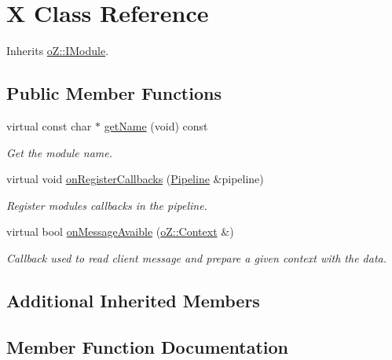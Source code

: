 \hypertarget{class_x}{}\section{X Class Reference}
\label{class_x}


Inherits \mbox{\hyperlink{classo_z_1_1_i_module}{o\+Z\+::\+I\+Module}}.

\subsection*{Public Member Functions}
\begin{DoxyCompactItemize}
\item 
virtual const char $\ast$ \mbox{\hyperlink{class_x_a07571cea65a55ff9820ad762eef52008}{get\+Name}} (void) const
\begin{DoxyCompactList}\small\item\em Get the module name. \end{DoxyCompactList}\item 
virtual void \mbox{\hyperlink{class_x_a15a956080c7158b8979f2a674ca28443}{on\+Register\+Callbacks}} (\mbox{\hyperlink{classo_z_1_1_pipeline}{Pipeline}} \&pipeline)
\begin{DoxyCompactList}\small\item\em Register module\textquotesingle{}s callbacks in the pipeline. \end{DoxyCompactList}\item 
virtual bool \mbox{\hyperlink{class_x_a5ca389f4b8f8ffb518cc37336f212118}{on\+Message\+Avaible}} (\mbox{\hyperlink{classo_z_1_1_context}{o\+Z\+::\+Context}} \&)
\begin{DoxyCompactList}\small\item\em Callback used to read client message and prepare a given context with the data. \end{DoxyCompactList}\end{DoxyCompactItemize}
\subsection*{Additional Inherited Members}


\subsection{Member Function Documentation}
\mbox{\label{class_x_a07571cea65a55ff9820ad762eef52008}} 
